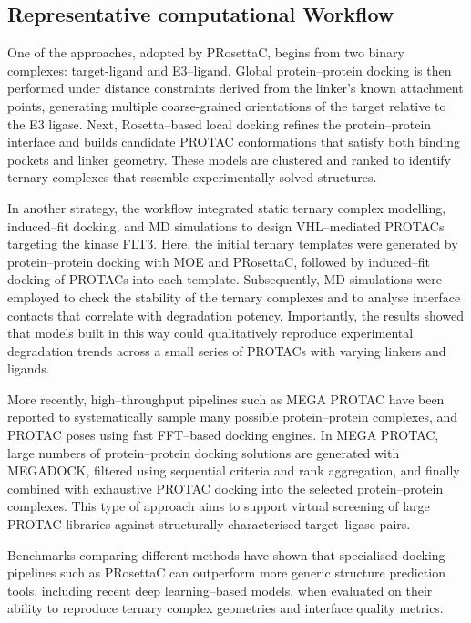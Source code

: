 \documentclass[12pt]{article}
\begin{document}
\subsection{Representative computational Workflow}

One of the approaches, adopted by PRosettaC\cite{CH14_PRosettaC2020}, begins from two binary complexes: target-ligand and E3–ligand. Global protein–protein docking is then performed under distance constraints derived from the linker's known attachment points, generating multiple coarse-grained orientations of the target relative to the E3 ligase.  Next, Rosetta–based local docking\cite{CH14_gray2003protein} refines the protein–protein interface and builds candidate PROTAC conformations that satisfy both binding pockets and linker geometry. These models are clustered and ranked to identify ternary complexes that resemble experimentally solved structures\cite{CH14_Drummond2020}.

In another strategy, the workflow integrated static ternary complex modelling, induced–fit docking, and MD simulations to design VHL–mediated PROTACs targeting the kinase FLT3\cite{CH14_flt3protac2025}. Here, the initial ternary templates were generated by protein–protein docking with MOE and PRosettaC\cite{CH14_PRosettaC2020}, followed by induced–fit docking of PROTACs into each template. Subsequently, MD simulations were employed to check the stability of the ternary complexes and to analyse interface contacts that correlate with degradation potency. Importantly, the results showed that models built in this way could qualitatively reproduce experimental degradation trends across a small series of PROTACs with varying linkers and ligands.

More recently, high–throughput pipelines such as MEGA PROTAC\cite{CH14_megaprotac2025}  have been reported to systematically sample many possible protein–protein complexes, and PROTAC poses using fast FFT–based docking engines.  In MEGA PROTAC, large numbers of protein–protein docking solutions are generated with MEGADOCK, filtered using sequential criteria and rank aggregation, and finally combined with exhaustive PROTAC docking into the selected protein–protein complexes. This type of approach aims to support virtual screening of large PROTAC libraries against structurally characterised target–ligase pairs.

Benchmarks comparing different methods have shown that specialised docking pipelines such as PRosettaC can outperform more generic structure prediction tools\cite{CH14_PRosettaCAf3_2025}, including recent deep learning–based models, when evaluated on their ability to reproduce ternary complex geometries and interface quality metrics.
\end{document}
